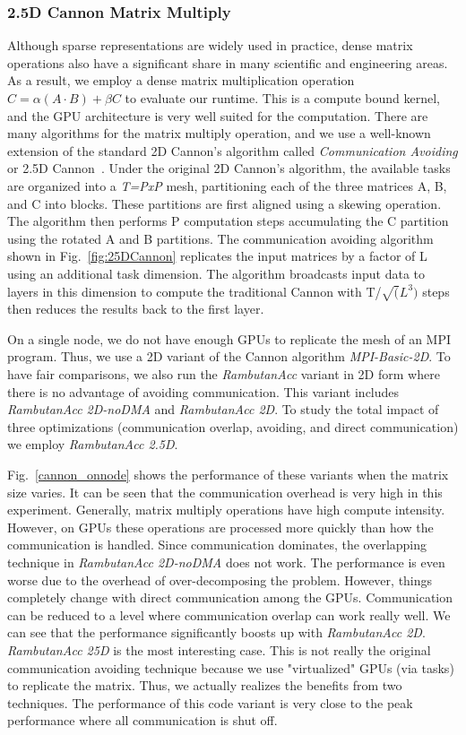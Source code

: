 \subsubsection{2.5D Cannon Matrix Multiply}
Although sparse representations are widely used in practice, dense matrix operations also have a significant share in many scientific and engineering areas.
As a result, we employ a dense matrix multiplication operation $C = \alpha (A \cdot B) + \beta C$ to evaluate our runtime.
This is a compute bound kernel, and the GPU architecture is very well suited for the computation. 
There are many algorithms for the matrix multiply operation, and we use a well-known extension of the standard 2D Cannon's algorithm called {\em Communication Avoiding} or 2.5D Cannon~\cite{25Dcannon}. 
Under the original 2D Cannon's algorithm, the available tasks are organized into a {\em T=PxP} mesh, partitioning each of the three matrices A, B, and C into blocks.
These partitions are first aligned using a skewing operation.
The algorithm then performs P computation steps accumulating the C partition using the rotated A and B partitions.
The communication avoiding algorithm shown in Fig.~\ref{fig:25DCannon} replicates the input matrices by a factor of L using an additional task dimension.
The algorithm broadcasts input data to layers in this dimension to compute the traditional Cannon with T/$\sqrt(L^3)$ steps then reduces the results back to the first layer.

On a single node, we do not have enough GPUs to replicate the mesh of an MPI program.
Thus, we use a 2D variant of the Cannon algorithm {\em MPI-Basic-2D}.
To have fair comparisons, we also run the {\em RambutanAcc} variant in 2D form where there is no advantage of avoiding communication.
This variant includes {\em RambutanAcc 2D-noDMA} and {\em RambutanAcc 2D}.
To study the total impact of three optimizations (communication overlap, avoiding, and direct communication) we employ {\em RambutanAcc 2.5D}.

Fig.~\ref{cannon_onnode} shows the performance of these variants when the matrix size varies.
It can be seen that the communication overhead is very high in this experiment.
Generally, matrix multiply operations have high compute intensity.
However, on GPUs these operations are processed more quickly than how the communication is handled.
Since communication dominates, the overlapping technique in {\em RambutanAcc 2D-noDMA} does not work.
The performance is even worse due to the overhead of over-decomposing the problem.
However, things completely change with direct communication among the GPUs.
Communication can be reduced to a level where communication overlap can work really well.
We can see that the performance significantly boosts up with {\em RambutanAcc 2D}.
{\em RambutanAcc 25D} is the most interesting case.
This is not really the original communication avoiding technique because we use "virtualized" GPUs (via tasks) to replicate the matrix. 
Thus, we actually realizes the benefits from two techniques.
The performance of this code variant is very close to the peak performance where all communication is shut off.




